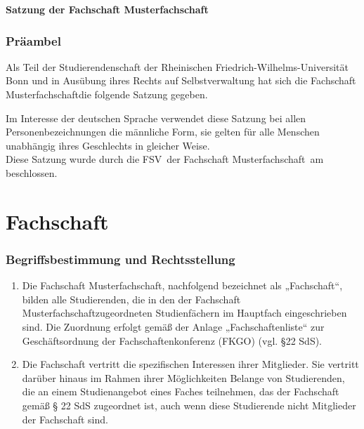 \documentclass{article}
\newcommand{\fachschaft}{Musterfachschaft}
\newcommand{\beschlussgremium}{FSV} %
\newcommand{\beschlussdatum}{01.01.2020} %
\begin{document}
\noindent
\begin{center}
    \huge \textbf{Satzung der Fachschaft \linebreak[1] \fachschaft} \\
    \large {}
\end{center}

\section*{Präambel}
\noindent
Als Teil der Studierendenschaft der Rheinischen Friedrich-Wilhelms-Universität Bonn und in Ausübung ihres Rechts auf Selbstverwaltung hat sich die Fachschaft \fachschaft die
folgende Satzung gegeben.

Im Interesse der deutschen Sprache verwendet
diese Satzung bei allen Personenbezeichnungen die männliche Form, sie gelten für alle Menschen unabhängig ihres Geschlechts in gleicher Weise. \\[2mm]
Diese Satzung wurde durch die \beschlussgremium\ der Fachschaft \fachschaft\ am \ifthenelse{\boolean{publish}}{\beschlussdatum }{\textcolor{red}{DD.MM.YYYY}} beschlossen.

\part{Fachschaft}
\section{Begriffsbestimmung und Rechtsstellung}
\begin{enumerate}[(1)]
\item Die Fachschaft \fachschaft , nachfolgend bezeichnet als „Fachschaft“, bilden alle Studierenden, die in den der Fachschaft \fachschaft zugeordneten Studienfächern im Hauptfach eingeschrieben sind. Die Zuordnung erfolgt gemäß der Anlage „Fachschaftenliste“ zur Geschäftsordnung der Fachschaftenkonferenz (FKGO) (vgl. §22 SdS).
\item Die Fachschaft vertritt die spezifischen Interessen ihrer Mitglieder. Sie vertritt darüber hinaus im Rahmen ihrer Möglichkeiten Belange von Studierenden, die an einem Studienangebot eines Faches teilnehmen, das der Fachschaft gemäß § 22 SdS zugeordnet ist, auch wenn diese Studierende nicht Mitglieder der Fachschaft sind.
\end{enumerate}
\end{document}
